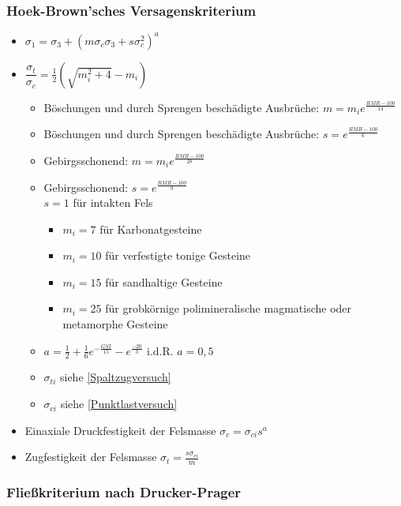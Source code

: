 \documentclass[fleqn,twoside]{article}
\begin{document}
\subsubsection{Hoek-Brown'sches Versagenskriterium}

\begin{itemize}
    \item $\sigma_1=\sigma_3+\left(m\sigma_c\sigma_3+s\sigma_c^2\right)^a$
    \item $\dfrac{\sigma_t}{\sigma_c}=\frac12\left(\sqrt{m_i^2+4}-m_i\right)$
    \begin{itemize}
        \item Böschungen und durch Sprengen beschädigte Ausbrüche: $m=m_ie^{\frac{RMR-100}{14}}$
        \item Böschungen und durch Sprengen beschädigte Ausbrüche: $s=e^{\frac{RMR-100}{6}}$
        \item Gebirgsschonend: $m=m_ie^{\frac{RMR-100}{28}}$ %
        \item Gebirgsschonend: $s=e^{\frac{RMR-100}{9}}$\\$s=1$ für intakten Fels
        \begin{itemize}
            \item $m_i=7$ für Karbonatgesteine
            \item $m_i=10$ für verfestigte tonige Gesteine
            \item $m_i=15$ für sandhaltige Gesteine
            \item $m_i=25$ für grobkörnige polimineralische magmatische oder metamorphe Gesteine
        \end{itemize}
        \item $a=\frac12+\frac16e^{-\frac{GSI}{15}}-e^{\frac{-20}{3}}$ i.d.R. $a=0,5$
        \item $\sigma_{ti}$ siehe \autoref{Spaltzugversuch}
        \item $\sigma_{ci}$ siehe \autoref{Punktlastversuch}
    \end{itemize}
    \item Einaxiale Druckfestigkeit der Felsmasse $\sigma_c=\sigma_{ci}s^a$
    \item Zugfestigkeit der Felsmasse $\sigma_t=\frac{s\sigma_{ci}}{m}$
\end{itemize}

\subsubsection{Fließkriterium nach Drucker-Prager}
\end{document}
